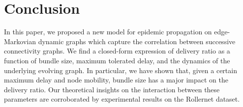 \documentclass[final,journal,letterpaper]{IEEEtran}
\begin{document}
\vfill \break

\section{Conclusion}
In this paper, we proposed a new model for epidemic propagation on edge-Markovian dynamic graphs which capture the correlation between successive connectivity graphs. We find a closed-form expression of delivery ratio as a function of bundle size, maximum tolerated delay, and the dynamics of the underlying evolving graph. In particular, we have shown that, given a certain maximum delay and node mobility, bundle size has a major impact on the delivery ratio. Our theoretical insights on the interaction between these parameters are corroborated by experimental results on the Rollernet dataset.

 

\end{document}
